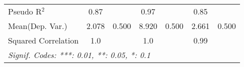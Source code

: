 \begin{tabular}{lcccccc}
   Pseudo R$^2$                                               & 0.87          &      & 0.97          &      & 0.85         & \\  
Mean(Dep. Var.) & 2.078 & 0.500 & 8.920 & 0.500 & 2.661 & 0.500 \\
   Squared Correlation                                        & 1.0           &      & 1.0           &      & 0.99         & \\  
   \midrule \midrule
   \multicolumn{7}{l}{\emph{Signif. Codes: ***: 0.01, **: 0.05, *: 0.1}}\\
\end{tabular}
\par\endgroup

